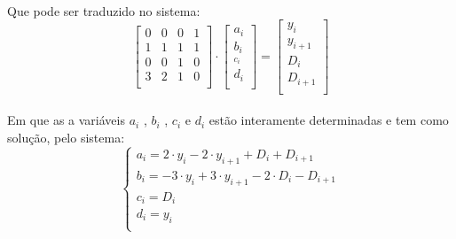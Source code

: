 \documentclass[a4paper,11pt]{article}
\begin{document}
\paragraph{}Que pode ser traduzido no sistema:
\begin{equation}
\left[
\begin{array}{cccc}
 0 & 0 & 0 & 1 \\
 1 & 1 & 1 & 1 \\
 0 & 0 & 1 & 0 \\
 3 & 2 & 1 & 0 \\
\end{array}
\right]
\cdot
\left[
\begin{array}{c}
a_i\\b_i\\_c_i\\d_i\\
\end{array}
\right]
= 
\left[
\begin{array}{c}
y_i\\y_{i+1}\\D_i\\D_{i+1}\\
\end{array}
\right]
\end{equation}
\paragraph{}Em que as a variáveis $a_i$ , $b_i$ , $c_i$ e $d_i$ estão interamente
determinadas e tem como solução, pelo sistema:
\begin{equation}\label{eq:splines.Yi-coef}
\left\{
\begin{array}{l}
a_i=2\cdot y_i - 2\cdot y_{i+1} + D_i + D_{i+1}\\
b_i=-3\cdot y_i +3\cdot y_{i+1} - 2\cdot D_i -D_{i+1}\\
c_i=D_i\\
d_i=y_i\\
\end{array}
\right.
\end{equation}
\end{document}
